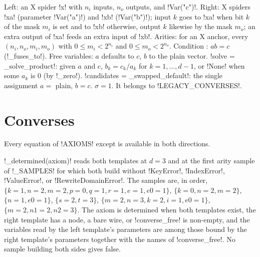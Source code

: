 Left: an X spider \code!x! with $n_i$ inputs, $n_o$ outputs, and \py!Var("c")!. Right: X spiders
\code!xa! (parameter \py!Var("a")!) and \code!xb! (\py!Var("b")!); input $k$ goes to \code!xa! when
bit $k$ of the mask $m_i$ is set and to \code!xb! otherwise, output $k$ likewise by the mask
$m_o$; an extra output of \code!xa! feeds an extra input of \code!xb!. Arities: for an X anchor,
every $(n_i,n_o,m_i,m_o)$ with $0\le m_i<2^{n_i}$ and $0\le m_o<2^{n_o}$. Condition
: $ab=c$ (\py!_fuses_to!). Free variables: $a$ defaults to $c$, $b$ to the plain
vector. \py!solve = _solve_product!: given $a$ and $c$, $b_k=c_k/a_k$ for $k=1,\dots,d-1$, or
\py!None! when some $a_k$ is $0$ (by \py!_zero!). \py!candidates = _swapped_default!: the single
assignment $a=$ plain, $b=c$. $\sigma=1$. It belongs to \py!LEGACY_CONVERSES!.

\section{Converses}\label{sec:completeness-converses}

Every equation of \py!AXIOMS! except  is available in both directions.

\begin{definition}\label{def:completeness-determined}
\py!_determined(axiom)! reads both templates at $d=3$ and at the first arity sample of
\py!_SAMPLES! for which both build without \py!KeyError!, \py!IndexError!, \py!ValueError!, or
\py!RewriteDomainError!. The samples are, in order,
$\{k{=}1,n{=}2,m{=}2,p{=}0,q{=}1,r{=}1,e{=}1,e0{=}1\}$, $\{k{=}0,n{=}2,m{=}2\}$, $\{n{=}1,e0{=}1\}$,
$\{s{=}2,t{=}3\}$, $\{m{=}2,n{=}3,k{=}2,i{=}1,e0{=}1\}$, $\{m{=}2,n1{=}2,n2{=}3\}$. The axiom is
determined when both templates exist, the right template has a node, a bare wire, or
\py!converse_free! is non-empty, and the variables read by the left template's parameters are
among those bound by the right template's parameters together with the names of
\py!converse_free!. No sample building both sides gives false.
\end{definition}


